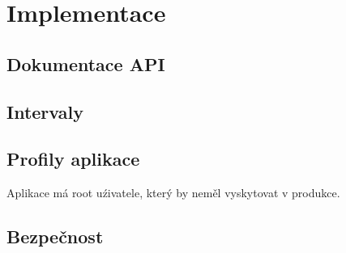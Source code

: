 \chapter{Implementace}

\section{Dokumentace API}
\section{Intervaly}
\section{Profily aplikace}
Aplikace má root uźivatele, který by neměl vyskytovat v produkce.
\section{Bezpečnost}
